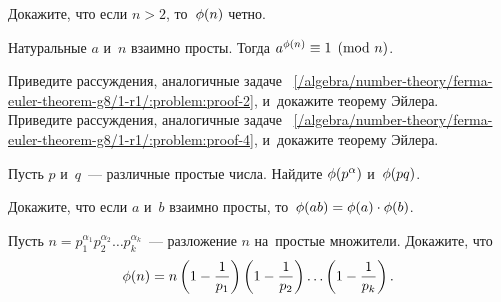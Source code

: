 Докажите, что если $n > 2$, то~$\phi(n)$ четно.

Натуральные $a$ и~$n$ взаимно просты.
Тогда $a^{\phi(n)} \equiv 1 \pmod{n}$.

\begin{problems}

\item
\subproblem
Приведите рассуждения, аналогичные задаче~%
\ref{/algebra/number-theory/ferma-euler-theorem-g8/1-r1/:problem:proof-2},
и~докажите теорему Эйлера.
\\
\subproblem
Приведите рассуждения, аналогичные задаче~%
\ref{/algebra/number-theory/ferma-euler-theorem-g8/1-r1/:problem:proof-4},
и~докажите теорему Эйлера.

\item
\subproblem
Пусть $p$ и~$q$~--- различные простые числа.
Найдите $\phi(p^\alpha)$ и~$\phi(p q)$.

\subproblem
Докажите, что если $a$ и~$b$ взаимно просты,
то~\(
    \phi(a b) = \phi(a) \cdot \phi(b)
\).

\subproblem
Пусть \(
    n
=
    p_{1}^{\alpha_{1}} p_{2}^{\alpha_{2}} \ldots p_{k}^{\alpha_{k}}
\)~---
разложение $n$ на~простые множители.
Докажите, что
\[
    \phi(n)
=
    n
    \left( 1 - \frac{1}{p_{1}} \right)
    \left( 1 - \frac{1}{p_{2}} \right)
    \ldots
    \left( 1 - \frac{1}{p_{k}} \right)
. \, \]


\end{problems}

